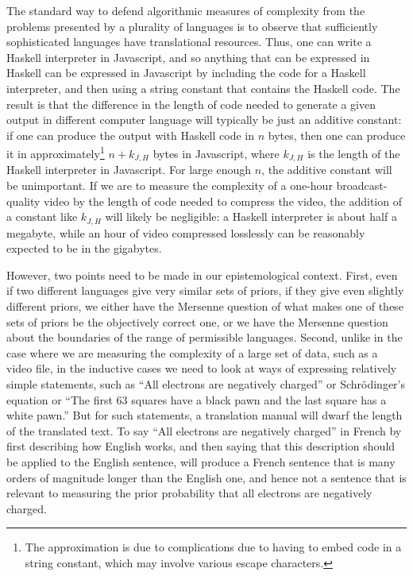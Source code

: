 The standard way to defend algorithmic measures of complexity from the problems presented by a plurality of languages
is to observe that sufficiently sophisticated languages have translational resources. Thus, one can write a Haskell interpreter
in Javascript, and so anything that can be expressed in Haskell can be expressed in Javascript by including the code for a Haskell interpreter, 
and then using a string constant that contains the Haskell code. The result is that the difference in the length of code needed to
generate a given output in different computer language will typically be just an additive constant: if one can
produce the output with Haskell code in $n$ bytes, then one can produce it in approximately\footnote{The approximation is due
to complications due to having to embed code in a string constant, which may involve various escape characters.} $n+k_{J,H}$ 
bytes in Javascript, where $k_{J,H}$ is the length of the Haskell interpreter in Javascript. For large enough $n$, the additive constant will be
unimportant. If we are to measure the complexity of a one-hour broadcast-quality video by the length of code needed to compress 
the  video, the addition of a constant like $k_{J,H}$ will likely be negligible: a Haskell interpreter is about half a megabyte, while 
an hour of video compressed losslessly can be reasonably expected to be in the gigabytes.

However, two points need to be made in our epistemological context. First, even if two different languages give very similar sets of priors, 
if they give even slightly different priors, we either have the Mersenne question of what makes one of these sets of priors be the 
objectively correct one, or we have the Mersenne question about the boundaries of the range of permissible languages. Second,
unlike in the case where we are measuring the complexity of a large set of data, such as a video file, in the inductive cases we 
need to look at ways of expressing relatively simple statements, such as ``All electrons are negatively charged'' or 
Schr\"odinger's equation or ``The first 63 squares have a black pawn and the last square has a white pawn.'' But for such statements, 
a translation manual will dwarf the length of the translated text. To say ``All electrons are negatively charged'' in French by first describing how English works, and then saying that this
description should be applied to the English sentence, will produce a French sentence that is many orders of magnitude longer
than the English one, and hence not a sentence that is relevant to measuring the prior probability that all electrons are negatively
charged.

